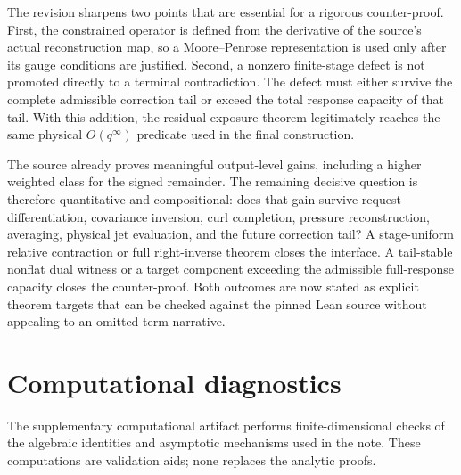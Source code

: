 \documentclass[12pt]{article}
\theoremstyle{plain}
\theoremstyle{definition}
\theoremstyle{remark}
\begin{document}
The revision sharpens two points that are essential for a rigorous counter-proof. First, the constrained operator is defined from the derivative of the source's actual reconstruction map, so a Moore--Penrose representation is used only after its gauge conditions are justified. Second, a nonzero finite-stage defect is not promoted directly to a terminal contradiction. The defect must either survive the complete admissible correction tail or exceed the total response capacity of that tail. With this addition, the residual-exposure theorem legitimately reaches the same physical \(O(q^\infty)\) predicate used in the final construction.

The source already proves meaningful output-level gains, including a higher weighted class for the signed remainder. The remaining decisive question is therefore quantitative and compositional: does that gain survive request differentiation, covariance inversion, curl completion, pressure reconstruction, averaging, physical jet evaluation, and the future correction tail? A stage-uniform relative contraction or full right-inverse theorem closes the interface. A tail-stable nonflat dual witness or a target component exceeding the admissible full-response capacity closes the counter-proof. Both outcomes are now stated as explicit theorem targets that can be checked against the pinned Lean source without appealing to an omitted-term narrative.

\appendix
\section{Computational diagnostics}\label{sec:computations}
The supplementary computational artifact  performs finite-dimensional checks of the algebraic identities and asymptotic mechanisms used in the note. These computations are validation aids; none replaces the analytic proofs.
\end{document}
